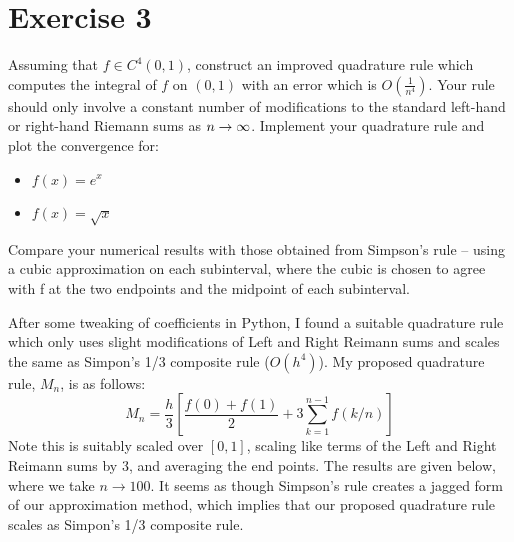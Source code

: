 \section{Exercise 3}
Assuming that $f \in C^4(0, 1)$, construct an improved quadrature rule which computes the integral of $f$ on $(0, 1)$ with an error which is $O(\frac{1}{n^4})$. Your rule should only involve a constant number of modifications to the standard left-hand or right-hand Riemann sums as $n \rightarrow \infty$. Implement your quadrature rule and plot the convergence for:
\begin{itemize}
    \item $f(x) = e^x$
    \item $f(x) = \sqrt{x}$
\end{itemize}
Compare your numerical results with those obtained from Simpson’s rule – using a cubic approximation on each subinterval, where the cubic is chosen to agree with f at the two endpoints and the midpoint of each subinterval.
\partbreak
\begin{solution}

    After some tweaking of coefficients in Python, I found a suitable quadrature rule which only uses slight modifications of Left and Right Reimann sums and scales the same as Simpon's 1/3 composite rule ($O(h^4)$). My proposed quadrature rule, $M_n$, is as follows:
    \[M_n = \frac{h}{3}\left[\frac{f(0) + f(1)}{2}  + 3\sum_{k = 1}^{n-1}f(k/n)\right]\]
    Note this is suitably scaled over $[0, 1]$, scaling like terms of the Left and Right Reimann sums by 3, and averaging the end points. The results are given below, where we take $n \to 100$. It seems as though Simpson's rule creates a jagged form of our approximation method, which implies that our proposed quadrature rule scales as Simpon's 1/3 composite rule.
\end{solution}

\begin{figure}[htbp]
    \centering
    \hfill
\end{figure}


